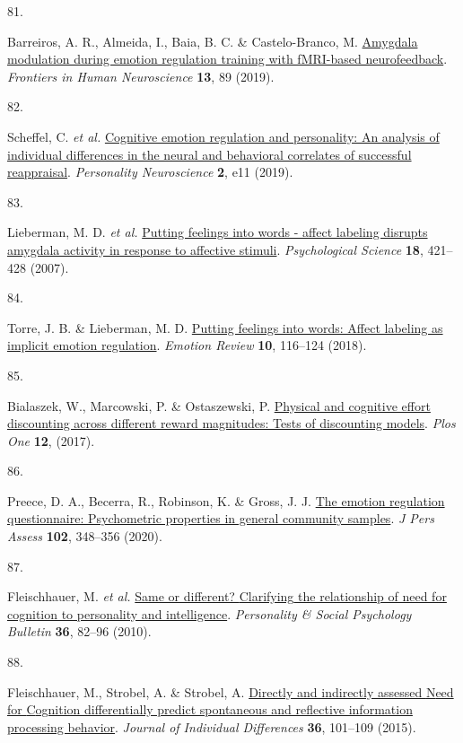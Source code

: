 \documentclass[
  man,floatsintext]{apa6}
\newlength{\cslhangindent}
\newlength{\csllabelwidth}
\newlength{\cslentryspacingunit} %
\newenvironment{CSLReferences}[2] %
 {%
  \setlength{\parindent}{0pt}
  \ifodd #1
  \let\oldpar\par
  \def\par{\hangindent=\cslhangindent\oldpar}
  \fi
  \setlength{\parskip}{#2\cslentryspacingunit}
 }%
 {}
\newcommand{\CSLLeftMargin}[1]{\parbox[t]{\csllabelwidth}{#1}}
\newcommand{\CSLRightInline}[1]{\parbox[t]{\linewidth - \csllabelwidth}{#1}\break}
\begin{document}
\begin{CSLReferences}{0}{0}
\leavevmode{}%
\CSLLeftMargin{81. }%
\CSLRightInline{Barreiros, A. R., Almeida, I., Baia, B. C. \& Castelo-Branco, M. \href{https://doi.org/10.3389/fnhum.2019.00089}{Amygdala modulation during emotion regulation training with fMRI-based neurofeedback}. \emph{Frontiers in Human Neuroscience} \textbf{13}, 89 (2019).}

\leavevmode{}%
\CSLLeftMargin{82. }%
\CSLRightInline{Scheffel, C. \emph{et al.} \href{https://doi.org/10.1017/pen.2019.11}{Cognitive emotion regulation and personality: An analysis of individual differences in the neural and behavioral correlates of successful reappraisal}. \emph{Personality Neuroscience} \textbf{2}, e11 (2019).}

\leavevmode{}%
\CSLLeftMargin{83. }%
\CSLRightInline{Lieberman, M. D. \emph{et al.} \href{https://doi.org/10.1111/j.1467-9280.2007.01916.x}{Putting feelings into words - affect labeling disrupts amygdala activity in response to affective stimuli}. \emph{Psychological Science} \textbf{18}, 421--428 (2007).}

\leavevmode{}%
\CSLLeftMargin{84. }%
\CSLRightInline{Torre, J. B. \& Lieberman, M. D. \href{https://doi.org/10.1177/1754073917742706}{Putting feelings into words: Affect labeling as implicit emotion regulation}. \emph{Emotion Review} \textbf{10}, 116--124 (2018).}

\leavevmode{}%
\CSLLeftMargin{85. }%
\CSLRightInline{Bialaszek, W., Marcowski, P. \& Ostaszewski, P. \href{https://doi.org/ARTN\%20e0182353\%0A10.1371/journal.pone.0182353}{Physical and cognitive effort discounting across different reward magnitudes: Tests of discounting models}. \emph{Plos One} \textbf{12}, (2017).}

\leavevmode{}%
\CSLLeftMargin{86. }%
\CSLRightInline{Preece, D. A., Becerra, R., Robinson, K. \& Gross, J. J. \href{https://doi.org/10.1080/00223891.2018.1564319}{The emotion regulation questionnaire: Psychometric properties in general community samples}. \emph{J Pers Assess} \textbf{102}, 348--356 (2020).}

\leavevmode{}%
\CSLLeftMargin{87. }%
\CSLRightInline{Fleischhauer, M. \emph{et al.} \href{https://doi.org/10.1177/0146167209351886}{Same or different? {Clarifying} the relationship of need for cognition to personality and intelligence}. \emph{Personality \& Social Psychology Bulletin} \textbf{36}, 82--96 (2010).}

\leavevmode{}%
\CSLLeftMargin{88. }%
\CSLRightInline{Fleischhauer, M., Strobel, A. \& Strobel, A. \href{https://doi.org/10.1027/1614-0001/a000161}{Directly and indirectly assessed {N}eed for {C}ognition differentially predict spontaneous and reflective information processing behavior}. \emph{Journal of Individual Differences} \textbf{36}, 101--109 (2015).}

\end{CSLReferences}
\end{document}
